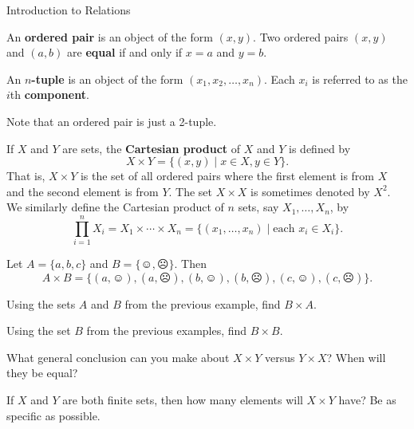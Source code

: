 \begin{section}{Introduction to Relations}

\begin{definition}
An \textbf{ordered pair} is an object of the form $(x,y)$. Two ordered pairs $(x,y)$ and $(a,b)$ are \textbf{equal} if and only if $x=a$ and $y=b$. 
\end{definition}

\begin{definition}
An \textbf{$n$-tuple} is an object of the form $(x_1, x_2,\ldots,x_n)$.  Each $x_i$ is referred to as the $i$th \textbf{component}.
\end{definition}

Note that an ordered pair is just a 2-tuple.

\begin{definition}
If $X$ and $Y$ are sets, the \textbf{Cartesian product} of $X$ and $Y$ is defined by
\[
X\times Y=\{(x,y)\mid x\in X, y\in Y\}.
\]
That is, $X\times Y$ is the set of all ordered pairs where the first element is from $X$ and the second element is from $Y$.  The set $X\times X$ is sometimes denoted by $X^2$.  We similarly define the Cartesian product of $n$ sets, say $X_1, \ldots, X_n$, by
\[
\prod_{i=1}^{n} X_i=X_1\times \cdots \times X_n=\{(x_1,\ldots,x_n)\mid \mbox{each } x_i\in X_i\}.
\]
\end{definition}

\begin{example}
Let $A=\{a,b,c\}$ and $B=\{\smiley,\frownie\}$.  Then 
\[
A\times B=\{(a,\smiley), (a,\frownie),(b,\smiley),(b,\frownie), (c,\smiley),(c,\frownie)\}.
\]
\end{example}

\begin{exercise}
Using the sets $A$ and $B$ from the previous example, find $B\times A$.  
\end{exercise}

\begin{exercise}
Using the set $B$ from the previous examples, find $B\times B$.  
\end{exercise}

\begin{exercise}
What general conclusion can you make about $X\times Y$ versus $Y\times X$?  When will they be equal?
\end{exercise}

\begin{exercise}
If $X$ and $Y$ are both finite sets, then how many elements will $X\times Y$ have?  Be as specific as possible.
\end{exercise}


\end{section}
